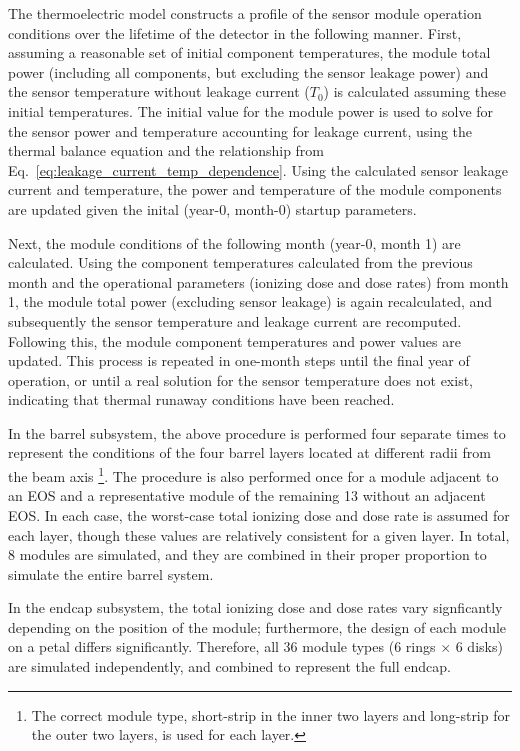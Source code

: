 
The thermoelectric model constructs a profile of the sensor module operation conditions over the
lifetime of the detector in the following manner. First, assuming a reasonable set of initial
component temperatures, the module total power (including all components, but excluding the sensor
leakage power) and the sensor temperature without leakage current ($T_0$) is calculated assuming these
initial temperatures.
The initial value for the module power is used to solve for the sensor power and temperature accounting
for leakage current, using the thermal balance equation and the relationship from
Eq.~\ref{eq:leakage_current_temp_dependence}.
Using the calculated sensor leakage current and temperature, the power and temperature of the module
components are updated given the inital (year-0, month-0) startup parameters.

Next, the module conditions of the following month (year-0, month 1) are calculated. Using the component
temperatures calculated from the previous month and the operational parameters (ionizing dose and dose
rates) from month 1, the module total power (excluding sensor leakage) is again recalculated, and
subsequently the sensor temperature and leakage current are recomputed. Following this,
the module component temperatures and power values are updated. This process is repeated in one-month
steps until the final year of operation, or until a real solution for the sensor temperature does not
exist, indicating that thermal runaway conditions have been reached.

In the barrel subsystem, the above procedure is performed four separate times to
represent the conditions of the four barrel layers located at different radii from the beam axis
\footnote{
The correct module type, short-strip in the inner two layers and long-strip for the outer two
layers, is used for each layer.
}.
%
The procedure is also performed once for a module adjacent to an EOS and a representative module
of the remaining 13 without an adjacent EOS. In each case, the worst-case total ionizing dose and dose
rate is assumed for each layer, though these values are relatively consistent for a given layer.
In total, 8 modules are simulated, and they are combined in their proper proportion to simulate the
entire barrel system.

In the endcap subsystem, the total ionizing dose and dose rates vary signficantly depending on the
position of the module; furthermore, the design of each module on a petal differs significantly.
Therefore, all 36 module types (6 rings $\times$ 6 disks) are simulated independently, and combined to
represent the full endcap.



